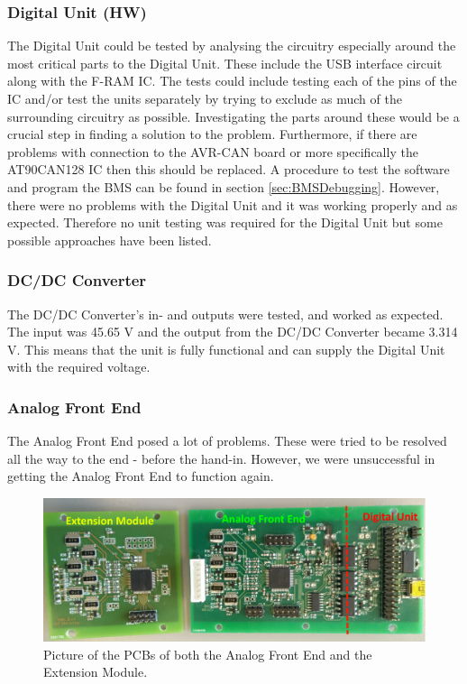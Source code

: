\subsubsection{Digital Unit (HW)}
The Digital Unit could be tested by analysing the circuitry especially around the most critical parts to the Digital Unit. These include the USB interface circuit along with the F-RAM IC. The tests could include testing each of the pins of the IC and/or test the units separately by trying to exclude as much of the surrounding circuitry as possible. Investigating the parts around these would be a crucial step in finding a solution to the problem. Furthermore, if there are problems with connection to the AVR-CAN board or more specifically the AT90CAN128 IC then this should be replaced. A procedure to test the software and program the BMS can be found in section \vref{sec:BMSDebugging}. However, there were no problems with the Digital Unit and it was working properly and as expected. Therefore no unit testing was required for the Digital Unit but some possible approaches have been listed.

\subsubsection{DC/DC Converter}
The DC/DC Converter's in- and outputs were tested, and worked as expected. The input was 45.65 V and the output from the DC/DC Converter became 3.314 V. This means that the unit is fully functional and can supply the Digital Unit with the required voltage.

\subsubsection{Analog Front End}
The Analog Front End posed a lot of problems. These were tried to be resolved all the way to the end - before the hand-in. However, we were unsuccessful in getting the Analog Front End to function again.\\

\begin{figure}[H]
	\centering
	\includegraphics[width=1.0\linewidth]{Hardware/Pictures/BMSPCBS}
	\caption[Empty]{Picture of the PCBs of both the Analog Front End and the Extension Module.}
	\label{fig:BMSPCBS}
\end{figure}

